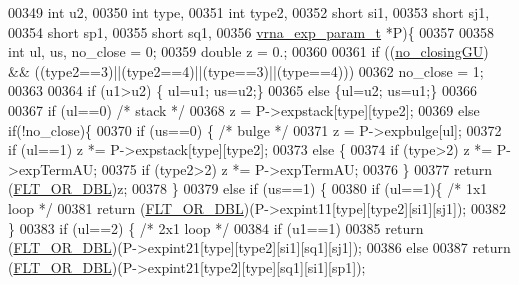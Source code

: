 \begin{DoxyCode}
00349               \textcolor{keywordtype}{int} u2,
00350               \textcolor{keywordtype}{int} type,
00351               \textcolor{keywordtype}{int} type2,
00352               \textcolor{keywordtype}{short} si1,
00353               \textcolor{keywordtype}{short} sj1,
00354               \textcolor{keywordtype}{short} sp1,
00355               \textcolor{keywordtype}{short} sq1,
00356               \hyperlink{group__energy__parameters_structvrna__exp__param__s}{vrna\_exp\_param\_t} *P)\{
00357 
00358   \textcolor{keywordtype}{int} ul, us, no\_close = 0;
00359   \textcolor{keywordtype}{double} z = 0.;
00360 
00361   \textcolor{keywordflow}{if} ((\hyperlink{group__model__details_gaa8d1c7b92489179e1eafa562b7bdd259}{no\_closingGU}) && ((type2==3)||(type2==4)||(type==3)||(type==4)))
00362     no\_close = 1;
00363 
00364   \textcolor{keywordflow}{if} (u1>u2) \{ ul=u1; us=u2;\}
00365   \textcolor{keywordflow}{else} \{ul=u2; us=u1;\}
00366 
00367   \textcolor{keywordflow}{if} (ul==0) \textcolor{comment}{/* stack */}
00368     z = P->expstack[type][type2];
00369   \textcolor{keywordflow}{else} \textcolor{keywordflow}{if}(!no\_close)\{
00370     \textcolor{keywordflow}{if} (us==0) \{                      \textcolor{comment}{/* bulge */}
00371       z = P->expbulge[ul];
00372       \textcolor{keywordflow}{if} (ul==1) z *= P->expstack[type][type2];
00373       \textcolor{keywordflow}{else} \{
00374         \textcolor{keywordflow}{if} (type>2) z *= P->expTermAU;
00375         \textcolor{keywordflow}{if} (type2>2) z *= P->expTermAU;
00376       \}
00377       \textcolor{keywordflow}{return} (\hyperlink{group__data__structures_ga31125aeace516926bf7f251f759b6126}{FLT\_OR\_DBL})z;
00378     \}
00379     \textcolor{keywordflow}{else} \textcolor{keywordflow}{if} (us==1) \{
00380       \textcolor{keywordflow}{if} (ul==1)\{                    \textcolor{comment}{/* 1x1 loop */}
00381         \textcolor{keywordflow}{return} (\hyperlink{group__data__structures_ga31125aeace516926bf7f251f759b6126}{FLT\_OR\_DBL})(P->expint11[type][type2][si1][sj1]);
00382       \}
00383       \textcolor{keywordflow}{if} (ul==2) \{                  \textcolor{comment}{/* 2x1 loop */}
00384         \textcolor{keywordflow}{if} (u1==1)
00385           \textcolor{keywordflow}{return} (\hyperlink{group__data__structures_ga31125aeace516926bf7f251f759b6126}{FLT\_OR\_DBL})(P->expint21[type][type2][si1][sq1][sj1]);
00386         \textcolor{keywordflow}{else}
00387           \textcolor{keywordflow}{return} (\hyperlink{group__data__structures_ga31125aeace516926bf7f251f759b6126}{FLT\_OR\_DBL})(P->expint21[type2][type][sq1][si1][sp1]);

\end{DoxyCode}
